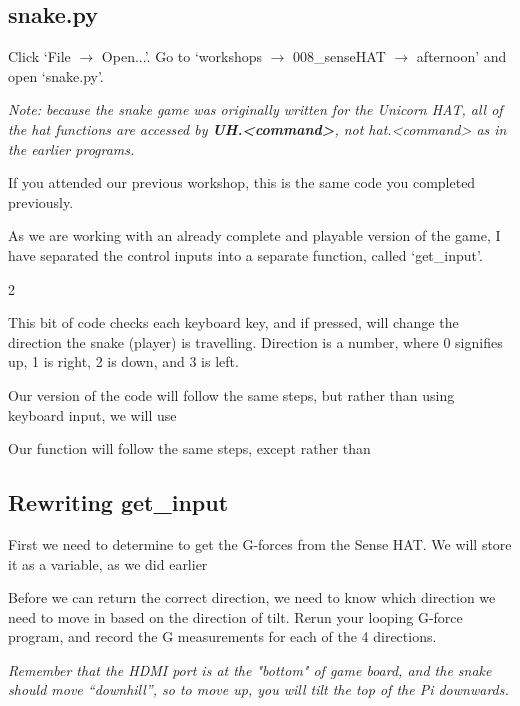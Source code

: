 	\subsection*{snake.py}
	
	Click `File $\rightarrow$ Open...'.
	Go to `workshops $\rightarrow$ 008\_senseHAT $\rightarrow$ afternoon' and open `snake.py'.
	
	\textit{Note: because the snake game was originally written for the Unicorn HAT, all of the hat functions are accessed by \textbf{UH.<command>}, not hat.<command> as in the earlier programs.}
	
	If you attended our previous workshop, this is the same code you completed previously.
	
	As we are working with an already complete and playable version of the game, I have separated the control inputs into a separate function, called `get\_input'.
	
2	
	
	This bit of code checks each keyboard key, and if pressed, will change the direction the snake (player) is travelling. Direction is a number, where 0 signifies up, 1 is right, 2 is down, and 3 is left.
	
	Our version of the code will follow the same steps, but rather than using keyboard input, we will use
	
	Our function will follow the same steps, except rather than 
	
	\subsection*{Rewriting get\_input}
	
	First we need to determine to get the G-forces from the Sense HAT. We will store it as a variable, as we did earlier
	
	
	
	Before we can return the correct direction, we need to know which direction we need to move in based on the direction of tilt. Rerun your looping G-force program, and record the G measurements for each of the 4 directions.
	
	\textit{\scriptsize Remember that the HDMI port is at the "bottom" of game board, and the snake should move ``downhill'', so to move up, you will tilt the top of the Pi downwards.}
	
